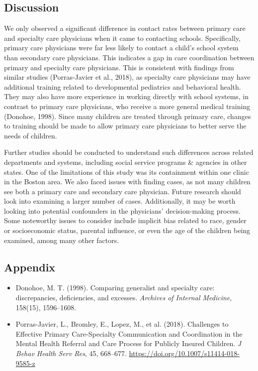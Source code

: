 \documentclass{article}
\begin{document}
	\subsection*{Discussion}
	We only observed a significant difference in contact rates between primary care and specialty care physicians when it came to contacting schools. Specifically, primary care physicians were far less likely to contact a child’s school system than secondary care physicians. This indicates a gap in care coordination between primary and specialty care physicians. This is consistent with findings from similar studies (Porras-Javier et al., 2018), as specialty care physicians may have additional training related to developmental pediatrics and behavioral health. They may also have more experience in working directly with school systems, in contrast to primary care physicians, who receive a more general medical training (Donohoe, 1998). Since many children are treated through primary care, changes to training should be made to allow primary care physicians to better serve the needs of children.

	Further studies should be conducted to understand such differences across related departments and systems, including social service programs \& agencies in other states. One of the limitations of this study was its containment within one clinic in the Boston area. We also faced issues with finding cases, as not many children see both a primary care and secondary care physician. Future research should look into examining a larger number of cases. Additionally, it may be worth looking into potential confounders in the physicians’ decision-making process. Some noteworthy issues to consider include implicit bias related to race, gender or socioeconomic status, parental influence, or even the age of the children being examined, among many other factors.

	\newpage
	\subsection*{Appendix}
	\begin{itemize}
		\item Donohoe, M. T. (1998). Comparing generalist and specialty care: discrepancies, deficiencies, and excesses. \textit{Archives of Internal Medicine}, 158(15), 1596--1608.
		
		\item Porras-Javier, L., Bromley, E., Lopez, M., et al. (2018). Challenges to Effective Primary Care-Specialty Communication and Coordination in the Mental Health Referral and Care Process for Publicly Insured Children. \textit{J Behav Health Serv Res}, 45, 668--677. \url{https://doi.org/10.1007/s11414-018-9585-z}
	\end{itemize}
\end{document}
